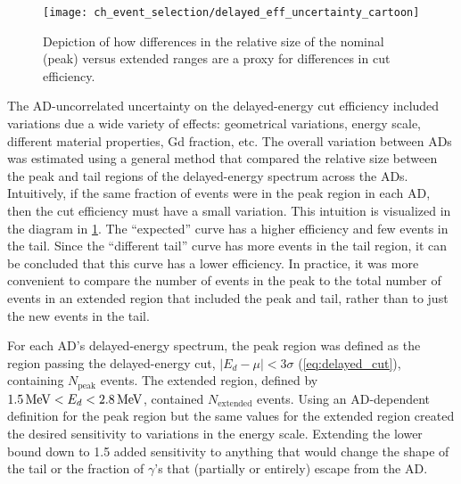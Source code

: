 \begin{figure}
    \centering
    \texttt{[image: ch\_event\_selection/delayed\_eff\_uncertainty\_cartoon]}
    \caption[Delayed energy efficiency diagram]{
        Depiction of how differences in the relative size
        of the nominal (peak) versus extended ranges
        are a proxy for differences in cut efficiency.
    }
    \label{fig:delayed_eff_unc_cartoon}
\end{figure}

The AD-uncorrelated uncertainty on the delayed-energy cut efficiency
included variations due a wide variety of effects:
geometrical variations, energy scale, different material properties,
Gd fraction, etc.
The overall variation between ADs was estimated using a general method
that compared the relative size between the peak and tail regions
of the delayed-energy spectrum across the ADs.
Intuitively, if the same fraction of events were in the peak region in each AD,
then the cut efficiency must have a small variation.
This intuition is visualized in the diagram in \cref{fig:delayed_eff_unc_cartoon}.
The ``expected'' curve has a higher efficiency
and few events in the tail.
Since the ``different tail'' curve has more events in the tail region,
it can be concluded that this curve has a lower efficiency.
In practice, it was more convenient to compare the number of events in the peak
to the total number of events in an extended region that included the peak and tail,
rather than to just the new events in the tail.

For each AD's delayed-energy spectrum, the peak region was defined as
the region passing the delayed-energy cut, $\vert E_d-\mu \vert < 3\sigma$
(\cref{eq:delayed_cut}), containing $N_\text{peak}$ events.
The extended region, defined by
$\SI{1.5}{\mega\electronvolt} < E_d < \SI{2.8}{\mega\electronvolt}$,
contained $N_\text{extended}$ events.
Using an AD-dependent definition for the peak region but
the same values for the extended region created
the desired sensitivity to variations in the energy scale.
Extending the lower bound down to \SI{1.5}{\mev} added sensitivity to
anything that would change the shape of the tail
or the fraction of $\gamma$'s that (partially or entirely) escape from the AD.

